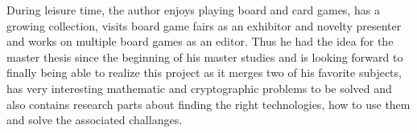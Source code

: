 During leisure time, the author enjoys playing board and card games, has a
growing collection, visits board game fairs as an exhibitor and novelty
presenter and works on multiple board games as an editor. Thus he had the idea
for the master thesis since the beginning of his master studies and is looking
forward to finally being able to realize this project as it merges two of his
favorite subjects, has very interesting mathematic and cryptographic problems to
be solved and also contains research parts about finding the right
technologies, how to use them and solve the associated challanges.
